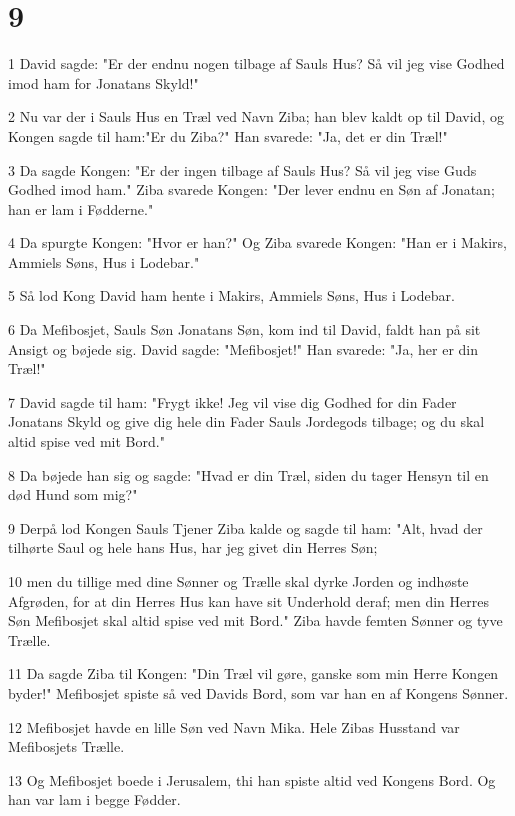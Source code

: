 \chapter{9}

\par 1 David sagde: "Er der endnu nogen tilbage af Sauls Hus? Så vil jeg vise Godhed imod ham for Jonatans Skyld!"
\par 2 Nu var der i Sauls Hus en Træl ved Navn Ziba; han blev kaldt op til David, og Kongen sagde til ham:"Er du Ziba?" Han svarede: "Ja, det er din Træl!"
\par 3 Da sagde Kongen: "Er der ingen tilbage af Sauls Hus? Så vil jeg vise Guds Godhed imod ham." Ziba svarede Kongen: "Der lever endnu en Søn af Jonatan; han er lam i Fødderne."
\par 4 Da spurgte Kongen: "Hvor er han?" Og Ziba svarede Kongen: "Han er i Makirs, Ammiels Søns, Hus i Lodebar."
\par 5 Så lod Kong David ham hente i Makirs, Ammiels Søns, Hus i Lodebar.
\par 6 Da Mefibosjet, Sauls Søn Jonatans Søn, kom ind til David, faldt han på sit Ansigt og bøjede sig. David sagde: "Mefibosjet!" Han svarede: "Ja, her er din Træl!"
\par 7 David sagde til ham: "Frygt ikke! Jeg vil vise dig Godhed for din Fader Jonatans Skyld og give dig hele din Fader Sauls Jordegods tilbage; og du skal altid spise ved mit Bord."
\par 8 Da bøjede han sig og sagde: "Hvad er din Træl, siden du tager Hensyn til en død Hund som mig?"
\par 9 Derpå lod Kongen Sauls Tjener Ziba kalde og sagde til ham: "Alt, hvad der tilhørte Saul og hele hans Hus, har jeg givet din Herres Søn;
\par 10 men du tillige med dine Sønner og Trælle skal dyrke Jorden og indhøste Afgrøden, for at din Herres Hus kan have sit Underhold deraf; men din Herres Søn Mefibosjet skal altid spise ved mit Bord." Ziba havde femten Sønner og tyve Trælle.
\par 11 Da sagde Ziba til Kongen: "Din Træl vil gøre, ganske som min Herre Kongen byder!" Mefibosjet spiste så ved Davids Bord, som var han en af Kongens Sønner.
\par 12 Mefibosjet havde en lille Søn ved Navn Mika. Hele Zibas Husstand var Mefibosjets Trælle.
\par 13 Og Mefibosjet boede i Jerusalem, thi han spiste altid ved Kongens Bord. Og han var lam i begge Fødder.


